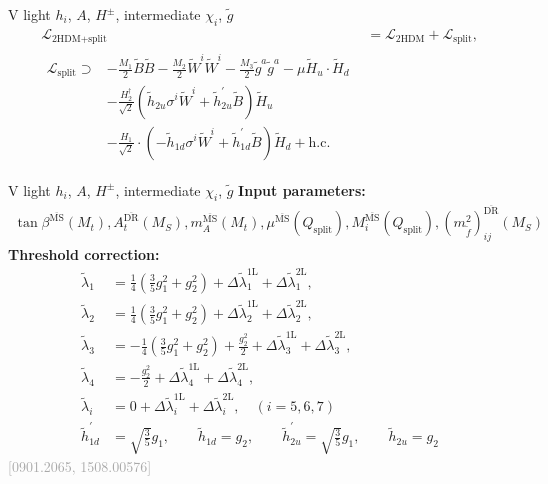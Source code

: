 \documentclass[hyperref={pdfpagelabels=false},ngerman]{beamer}
\newcommand{\MS}{\ensuremath{M_S}}
\newcommand{\bigcite}[1]{\textcolor{darkgray}{[#1]}}
\renewcommand{\emph}{\textbf}
\newcommand{\DRbar}{\ensuremath{\overline{\text{DR}}}}
\newcommand{\MSbar}{\ensuremath{\overline{\text{MS}}}}
\newcommand{\SplitTHDM}{\ensuremath{\text{2HDM+split}}\xspace}
\newcommand{\THDM}{\ensuremath{\text{2HDM}}\xspace}
\newcommand{\hc}{\ensuremath{\text{h.c.}}}
\newcommand{\Qsplit}{\ensuremath{Q_\text{split}}\xspace}
\newcommand{\Lag}{\ensuremath{\mathcal{L}}}
\newcommand{\DlSplitTHDM}[2]{\Delta\tilde\lambda_{#1}^{\text{#2L}}}
\newcommand{\gSplitTHDM}[1]{\ensuremath{\tilde{h}_{#1}}}
\newcommand{\gpSplitTHDM}[1]{\ensuremath{\tilde{h}_{#1}^{\prime}}}
\begin{document}
\begin{frame}[noframenumbering]{V light $h_i$, $A$, $H^{\pm}$, intermediate $\chi_i$, $\tilde{g}$}
\begin{align*}
  \Lag_{\SplitTHDM} &= \Lag_{\THDM} + \Lag_\text{split}, \\
\begin{split}
  \Lag_\text{split} \supset
  &- \frac{M_1}{2} \tilde{B}\tilde{B}
  - \frac{M_2}{2} \tilde{W}^i\tilde{W}^i
  - \frac{M_3}{2} \tilde{g}^a\tilde{g}^a
  - \mu \tilde{H}_u\cdot \tilde{H}_d \\
  &-\frac{H_2^\dagger}{\sqrt{2}} \left( \gSplitTHDM{2u} \sigma^i\tilde{W}^i
     +\gpSplitTHDM{2u} \tilde{B} \right)\tilde{H}_u \\
  &-\frac{H_1}{\sqrt{2}} \cdot  \left( -\gSplitTHDM{1d} \sigma^i\tilde{W}^i
     + \gpSplitTHDM{1d} \tilde{B} \right) \tilde{H}_d
  + \hc
\end{split}
\end{align*}
\end{frame}

\begin{frame}[noframenumbering]{V light $h_i$, $A$, $H^{\pm}$, intermediate $\chi_i$, $\tilde{g}$}
  \emph{Input parameters:}
  \begin{align*}
  \tan\beta^{\MSbar}(M_t), A_t^{\DRbar}(\MS), m_A^{\MSbar}(M_t),
  \mu^{\MSbar}(\Qsplit), M_i^{\MSbar}(\Qsplit),
  (m_{\tilde{f}}^2)^{\DRbar}_{ij}(\MS)
  \end{align*}
  \emph{Threshold correction:}
  \begin{align*}
    \tilde\lambda_1 &= \frac{1}{4}\left(\frac{3}{5} g_1^2 + g_2^2\right) + \DlSplitTHDM{1}{1} + \DlSplitTHDM{1}{2},\\
    \tilde\lambda_2 &= \frac{1}{4}\left(\frac{3}{5} g_1^2 + g_2^2\right) + \DlSplitTHDM{2}{1} + \DlSplitTHDM{2}{2},\\
    \tilde\lambda_3 &= -\frac{1}{4} \left(\frac{3}{5}g_1^2 + g_2^2\right) + \frac{g_2^2}{2} + \DlSplitTHDM{3}{1} + \DlSplitTHDM{3}{2},\\
    \tilde\lambda_4 &= -\frac{g_2^2}{2} + \DlSplitTHDM{4}{1} + \DlSplitTHDM{4}{2},\\
    \tilde\lambda_i &= 0 + \DlSplitTHDM{i}{1} + \DlSplitTHDM{i}{2}, \quad (i = 5,6,7)\\
    \gpSplitTHDM{1d} &= \sqrt{\frac{3}{5}} g_1, \qquad
    \gSplitTHDM{1d}  = g_2, \qquad
    \gpSplitTHDM{2u} = \sqrt{\frac{3}{5}} g_1, \qquad
    \gSplitTHDM{2u}  = g_2
  \end{align*}
  \hfill\bigcite{0901.2065, 1508.00576}
\end{frame}
\end{document}
